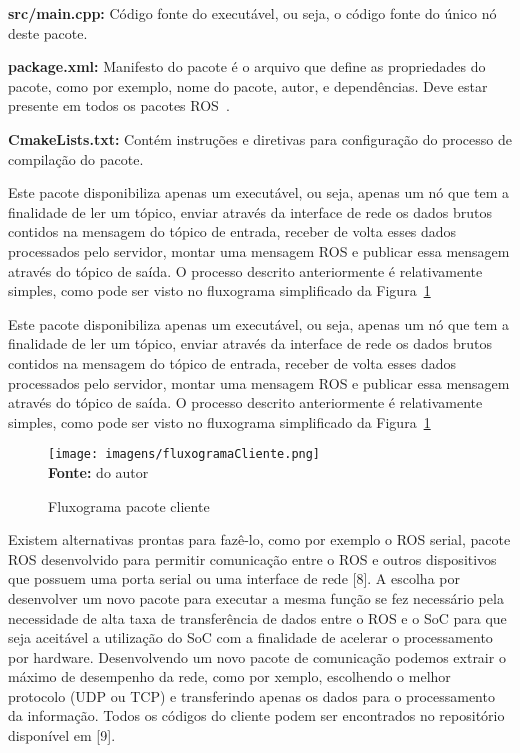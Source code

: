 \textbf{src/main.cpp:} Código fonte do executável, ou seja, o código fonte do único nó deste pacote.

\textbf{package.xml:} Manifesto do pacote é o arquivo que define as propriedades do pacote, como por exemplo, nome do pacote, autor, e dependências. Deve estar presente em todos os pacotes ROS~\cite{RosPkgXml}.


\textbf{CmakeLists.txt:} Contém instruções e diretivas para configuração do processo de compilação do pacote.

Este pacote disponibiliza apenas um executável, ou seja, apenas um nó que tem a finalidade de ler um tópico, enviar através da interface de rede os dados brutos contidos na mensagem do tópico de entrada, receber de volta esses dados processados pelo servidor, montar uma mensagem ROS e publicar essa mensagem através do tópico de saída. O processo descrito anteriormente é relativamente simples, como pode ser visto no fluxograma simplificado da Figura~\ref{fig:clientfluxo}

Este pacote disponibiliza apenas um executável, ou seja, apenas um nó que tem a finalidade de ler um tópico, enviar através da interface de rede os dados brutos contidos na mensagem do tópico de entrada, receber de volta esses dados processados pelo servidor, montar uma mensagem ROS e publicar essa mensagem através do tópico de saída. O processo descrito anteriormente é relativamente simples, como pode ser visto no fluxograma simplificado da Figura~\ref{fig:clientfluxo}

\begin{figure}[ht]
	\caption{Fluxograma pacote cliente}
	\begin{center}
		\texttt{[image: imagens/fluxogramaCliente.png]}\\
		{\small \textbf{Fonte:} do autor}
    \end{center}\label{fig:clientfluxo}
\end{figure}

Existem alternativas prontas para fazê-lo, como por exemplo o ROS serial, pacote ROS desenvolvido para permitir comunicação entre o ROS e outros dispositivos que possuem uma porta serial ou uma interface de rede [8]. A escolha por desenvolver um novo pacote para executar a mesma função se fez necessário pela necessidade de alta taxa de transferência de dados entre o ROS e o SoC para que seja aceitável a utilização do SoC com a finalidade de acelerar o processamento por hardware. Desenvolvendo um novo pacote de comunicação podemos extrair o máximo de desempenho da rede, como por  xemplo, escolhendo o melhor protocolo (UDP ou TCP) e transferindo apenas os dados para o processamento da informação. Todos os códigos do cliente podem ser encontrados no repositório disponível em [9].
